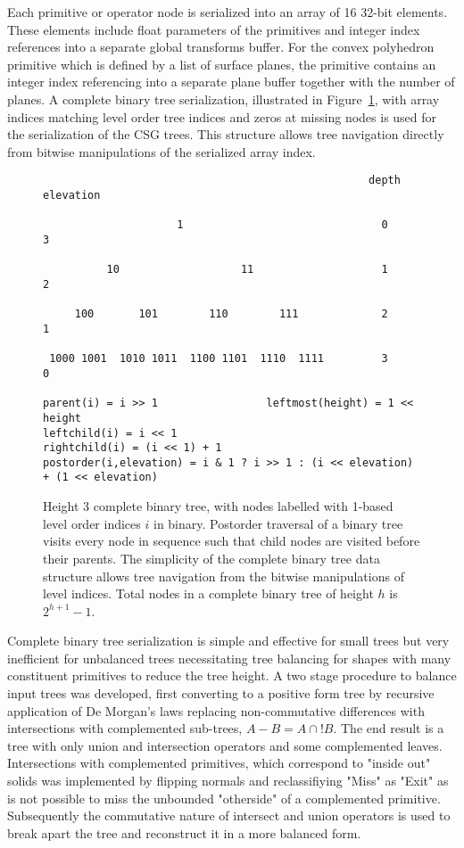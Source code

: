 \documentclass{webofc}
\begin{document}
Each primitive or operator node is serialized into an array of 16 32-bit elements. 
These elements include float parameters of the primitives and integer index references 
into a separate global transforms buffer. For the convex polyhedron primitive which is defined by a list of surface planes, 
the primitive contains an integer index referencing into a separate plane buffer together with the number of planes. 
A complete binary tree serialization, illustrated in Figure~\ref{tree},  with array indices matching level order tree indices
and zeros at missing nodes is used for the serialization of the CSG trees. This structure   
allows tree navigation directly from bitwise manipulations of the serialized array index. 
%
\begin{figure}[h]
\begin{verbatim}
                                                   depth     elevation

                     1                               0           3   

          10                   11                    1           2   

     100       101        110        111             2           1   
                    
 1000 1001  1010 1011  1100 1101  1110  1111         3           0   

parent(i) = i >> 1                 leftmost(height) = 1 << height 
leftchild(i) = i << 1               
rightchild(i) = (i << 1) + 1  
postorder(i,elevation) = i & 1 ? i >> 1 : (i << elevation) + (1 << elevation) 
\end{verbatim}

\caption{Height 3 complete binary tree, with nodes labelled with 1-based level order indices $i$ in binary. Postorder traversal of a binary tree
visits every node in sequence such that child nodes are visited before their parents. The simplicity of the complete binary tree data structure allows tree navigation 
from the bitwise manipulations of level indices. Total nodes in a complete binary tree of height $h$ is $2^{h+1} - 1$.  }
\label{tree}
\end{figure}

Complete binary tree serialization is simple and effective for small trees but very inefficient 
for unbalanced trees necessitating tree balancing for shapes with many constituent primitives 
to reduce the tree height.  A two stage procedure to balance input trees was developed, 
first converting to a positive form tree by recursive application of De Morgan's laws replacing 
non-commutative differences with intersections with complemented sub-trees, $A - B  = A \cap !B $. 
The end result is a tree with only union and intersection operators and some complemented leaves. Intersections with 
complemented primitives, which correspond to "inside out" solids was implemented by flipping normals
and reclassifiying "Miss" as "Exit" as is not possible to miss the unbounded "otherside" of a 
complemented primitive.  Subsequently the commutative nature of intersect and union operators is used
to break apart the tree and reconstruct it in a more balanced form. 
\end{document}
